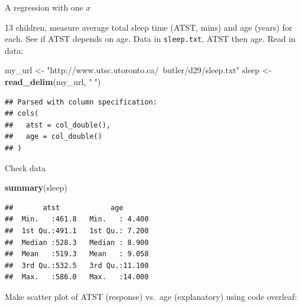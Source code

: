 \documentclass[
  ignorenonframetext,
]{beamer}
\newenvironment{Shaded}{\begin{snugshade}}{\end{snugshade}}
\newcommand{\KeywordTok}[1]{\textcolor[rgb]{0.13,0.29,0.53}{\textbf{#1}}}
\newcommand{\NormalTok}[1]{#1}
\newcommand{\StringTok}[1]{\textcolor[rgb]{0.31,0.60,0.02}{#1}}
\begin{document}
\begin{frame}[fragile]{A regression with one \(x\)}
\protect\hypertarget{a-regression-with-one-x}{}

13 children, measure average total sleep time (ATST, mins) and age
(years) for each. See if ATST depends on age. Data in
\texttt{sleep.txt}, ATST then age. Read in data:

\begin{Shaded}
\begin{Highlighting}[]
\NormalTok{my_url <-}\StringTok{ "http://www.utsc.utoronto.ca/~butler/d29/sleep.txt"}
\NormalTok{sleep <-}\StringTok{ }\KeywordTok{read_delim}\NormalTok{(my_url, }\StringTok{" "}\NormalTok{)}
\end{Highlighting}
\end{Shaded}

\begin{verbatim}
## Parsed with column specification:
## cols(
##   atst = col_double(),
##   age = col_double()
## )
\end{verbatim}

\end{frame}

\begin{frame}[fragile]{Check data}
\protect\hypertarget{check-data}{}

\begin{Shaded}
\begin{Highlighting}[]
\KeywordTok{summary}\NormalTok{(sleep)}
\end{Highlighting}
\end{Shaded}

\begin{verbatim}
##       atst            age        
##  Min.   :461.8   Min.   : 4.400  
##  1st Qu.:491.1   1st Qu.: 7.200  
##  Median :528.3   Median : 8.900  
##  Mean   :519.3   Mean   : 9.058  
##  3rd Qu.:532.5   3rd Qu.:11.100  
##  Max.   :586.0   Max.   :14.000
\end{verbatim}

Make scatter plot of ATST (response) vs.~age (explanatory) using code
overleaf:

\end{frame}
\end{document}
